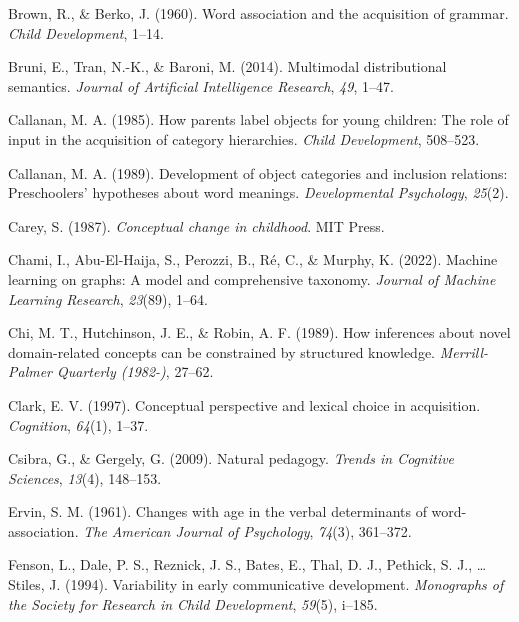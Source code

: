 \documentclass[english,,man]{apa6}
\begin{document}
\leavevmode\hypertarget{ref-brown1960word}{}%
Brown, R., \& Berko, J. (1960). Word association and the acquisition of grammar. \emph{Child Development}, 1--14.

\leavevmode\hypertarget{ref-bruni2014}{}%
Bruni, E., Tran, N.-K., \& Baroni, M. (2014). Multimodal distributional semantics. \emph{Journal of Artificial Intelligence Research}, \emph{49}, 1--47.

\leavevmode\hypertarget{ref-callanan1985}{}%
Callanan, M. A. (1985). How parents label objects for young children: The role of input in the acquisition of category hierarchies. \emph{Child Development}, 508--523.

\leavevmode\hypertarget{ref-callanan1989}{}%
Callanan, M. A. (1989). Development of object categories and inclusion relations: Preschoolers' hypotheses about word meanings. \emph{Developmental Psychology}, \emph{25}(2).

\leavevmode\hypertarget{ref-carey1987}{}%
Carey, S. (1987). \emph{Conceptual change in childhood}. MIT Press.

\leavevmode\hypertarget{ref-chami2022machine}{}%
Chami, I., Abu-El-Haija, S., Perozzi, B., Ré, C., \& Murphy, K. (2022). Machine learning on graphs: A model and comprehensive taxonomy. \emph{Journal of Machine Learning Research}, \emph{23}(89), 1--64.

\leavevmode\hypertarget{ref-chi1989}{}%
Chi, M. T., Hutchinson, J. E., \& Robin, A. F. (1989). How inferences about novel domain-related concepts can be constrained by structured knowledge. \emph{Merrill-Palmer Quarterly (1982-)}, 27--62.

\leavevmode\hypertarget{ref-clark1997}{}%
Clark, E. V. (1997). Conceptual perspective and lexical choice in acquisition. \emph{Cognition}, \emph{64}(1), 1--37.

\leavevmode\hypertarget{ref-csibra2009}{}%
Csibra, G., \& Gergely, G. (2009). Natural pedagogy. \emph{Trends in Cognitive Sciences}, \emph{13}(4), 148--153.

\leavevmode\hypertarget{ref-ervin1961changes}{}%
Ervin, S. M. (1961). Changes with age in the verbal determinants of word-association. \emph{The American Journal of Psychology}, \emph{74}(3), 361--372.

\leavevmode\hypertarget{ref-fenson94}{}%
Fenson, L., Dale, P. S., Reznick, J. S., Bates, E., Thal, D. J., Pethick, S. J., \ldots{} Stiles, J. (1994). Variability in early communicative development. \emph{Monographs of the Society for Research in Child Development}, \emph{59}(5), i--185.
\end{document}
